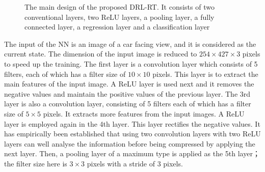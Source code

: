 \documentclass{svproc}
\begin{document}
\begin{figure}[!ht]
	\vspace{-6ex}
	\centering
	
	\vspace{-4ex}
	
	\begin{scriptsize}	\caption{The main design of the proposed DRL-RT. It consists of two conventional layers, two ReLU layers, a pooling layer, a fully connected layer, a regression layer and a classification layer\label{Fig:Deep_Reinf_Net}}\end{scriptsize}
		\vspace{-4ex}
\end{figure}

The input of the NN is an image of a car facing view, and it is considered as the current state. The dimension of the input image is reduced to $254 \times 427 \times 3$ pixels to speed up the training. The first layer is a convolution layer which consists of 5 filters, each of which has a filter size of $10 \times 10$ pixels. This layer is to extract the main features of the input image. A ReLU layer is used next and it removes the negative values and maintain the positive values of the previous layer. The 3rd layer is also a convolution layer, consisting of 5 filters each of which has a filter size of $5 \times 5$ pixels. It extracts more features from the input images. A ReLU layer is employed again in the 4th layer. This layer rectifies the negative values. It has empirically been established that using two convolution layers with two ReLU layers can well analyse the information before being compressed by applying the next layer. Then, a pooling layer of a maximum type is applied as the 5th layer； the filter size here is $3 \times 3$ pixels with a stride of 3 pixels. 
\end{document}
